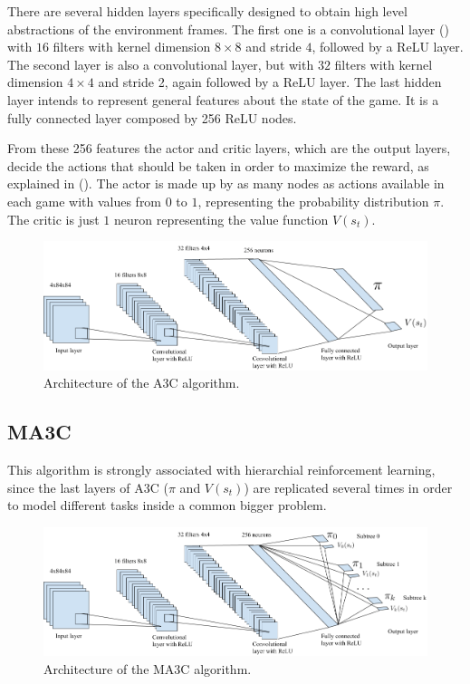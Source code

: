 There are several hidden layers specifically designed to obtain high level abstractions of the environment frames.
The first one is a convolutional layer () with $16$ filters with kernel dimension $8 \times 8$ and stride $4$,
followed by a \ac{ReLU} layer.
The second layer is also a convolutional layer, but with $32$ filters with kernel dimension $4 \times 4$ and stride 2,
again followed by a \ac{ReLU} layer.
The last hidden layer intends to represent general features about the state of the game.
It is a fully connected layer composed by 256 ReLU nodes.

From these 256 features the actor and critic layers, which are the output layers, decide the actions that should be taken
in order to maximize the reward, as explained in ().
The actor is made up by as many nodes as actions available in each game with values from $0$ to $1$, representing the
probability distribution $\pi$.
The critic is just $1$ neuron representing the value function $V(s_t)$.

\begin{figure}[hbtp]
\begin{center}
\includegraphics[width=430]{img/A3C_architecture.png}
\end{center}
\caption[A3C architecture]
{Architecture of the \ac{A3C} algorithm.}
\label{fig:A3C}
\end{figure}

\subsection{\acl{MA3C}\label{subsec:MA3C}}

This algorithm is strongly associated with hierarchial reinforcement learning, since the last layers of \ac{A3C}
($\pi$ and $V(s_t)$) are replicated several times in order to model different tasks inside a common bigger problem.

\begin{figure}[hbtp]
\begin{center}
\includegraphics[width=430]{img/MA3C_architecture.png}
\end{center}
\caption[MA3C architecture]
{Architecture of the \ac{MA3C} algorithm.}
\label{fig:MA3C}
\end{figure}


